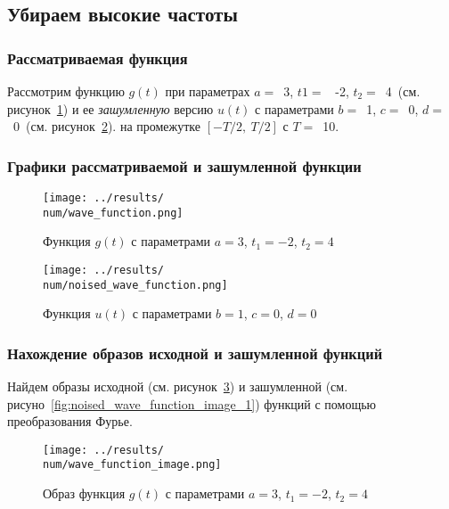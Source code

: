 \subsection{Убираем высокие частоты}

\def\num{1}
\def\a{3}
\def\from{-2}
\def\to{4}
\def\b{1}
\def\c{0}
\def\d{0}
\def\T{10}
\def\imageclip{10}

\subsubsection{Рассматриваемая функция}
Рассмотрим функцию $g(t)$ при параметрах $a=$~\a, $t1 =$~ \from, $t_2 =$~\to ~(см. рисунок~\ref{fig:wave_function_\num}) 
и ее \textit{зашумленную} версию $u(t)$ с параметрами $b =$~\b, $c =$~\c, $d =$~\d ~(см. рисунок~\ref{fig:noised_wave_function_\num}).
на промежутке $[-T/2,~T/2]$ с $T =$~\T.

\FloatBarrier
\subsubsection{Графики рассматриваемой и зашумленной функции}
\begin{figure}[ht!]
    \centering
    \texttt{[image: ../results/\\num/wave\_function.png]}
    \caption{Функция $g(t)$ с параметрами $a = \a$, $t_1 = \from$, $t_2 = \to$}
    \label{fig:wave_function_\num}
\end{figure}

\begin{figure}[ht!]
    \centering
    \texttt{[image: ../results/\\num/noised\_wave\_function.png]}
    \caption{Функция $u(t)$ с параметрами $b = \b$, $c = \c$, $d = \d$}
    \label{fig:noised_wave_function_\num}
\end{figure}

\FloatBarrier
\subsubsection{Нахождение образов исходной и зашумленной функций}
Найдем образы исходной (см. рисунок~\ref{fig:wave_function_image_\num}) 
и зашумленной (см. рисуно~\ref{fig:noised_wave_function_image_\num}) функций с помощью преобразования Фурье. 

\begin{figure}[ht!]
    \centering
    \texttt{[image: ../results/\\num/wave\_function\_image.png]}
    \caption{Образ функция $g(t)$ с параметрами $a = \a$, $t_1 = \from$, $t_2 = \to$}
    \label{fig:wave_function_image_\num}
\end{figure}

